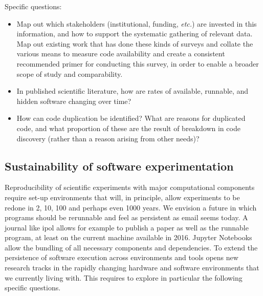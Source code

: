 \documentclass[a4paper,UKenglish]{dagman}
\newcommand{\etc}{\emph{etc.}\xspace}
\begin{document}
Specific questions:
\begin{itemize}
\item Map out which stakeholders (institutional, funding, \etc) are invested in this information, and how to support the systematic gathering of relevant data. Map out existing work that has done these kinds of surveys and collate the various means to measure code availability and create a consistent recommended primer for conducting this survey, in order to enable a broader scope of study and comparability.
\item In published scientific literature, how are rates of available, runnable, and hidden software changing over time?
\item How can code duplication be identified? What are reasons for duplicated code, and what proportion of these are the result of breakdown in code discovery (rather than a reason arising from other needs)?
\end{itemize}

\subsection{Sustainability of software experimentation}

Reproducibility of scientific experiments with major computational components require set-up environments that will, in principle, allow experiments to be redone in 2, 10, 100 and perhaps even 1000 years. We envision a future in which programs should be rerunnable and feel as persistent as email seems today. A journal like ipol allows for example to publish a paper as well as the runnable program, at least on the current machine available in 2016. Jupyter Notebooks allow the bundling of all necessary components and dependencies. To extend the persistence of software execution across environments and tools opens new research tracks in the rapidly changing hardware and software environments that we currently living with. This requires to explore in particular the following specific questions. 
\end{document}
